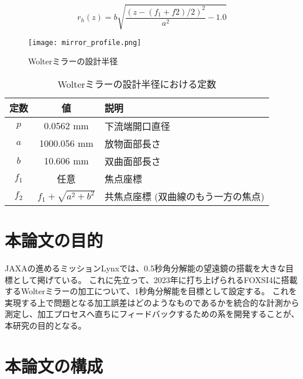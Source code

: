 \begin{equation}
    r_h(z) = b \sqrt{ \frac{(z - (f_1 + f2) / 2)^2}{a^2} - 1.0 }
\end{equation}

\begin{figure}[h]
\centering
\texttt{[image: mirror\_profile.png]}
\caption{Wolterミラーの設計半径}
\label{fig:wolter_profile}
\end{figure}

\begin{table}[htb]
    \begin{center}
      \begin{tabular}{|c|c|l|} \hline
        定数 & 値 & 説明 \\ \hline
        $p$ & 0.0562 mm & 下流端開口直径 \\
        $a$ & 1000.056 mm & 放物面部長さ \\
        $b$ & 10.606 mm & 双曲面部長さ \\ 
        $f_1$ & 任意 & 焦点座標 \\
        $f_2$ & $f_1 + \sqrt{ a^2 + b^2 }$  & 共焦点座標 (双曲線のもう一方の焦点) \\\hline
      \end{tabular}
      \caption{Wolterミラーの設計半径における定数}
      \label{tb:wolter_profile_constants}
    \end{center}
\end{table}


\clearpage
\newpage
\section{本論文の目的}
\label{chap1_purpose}

JAXAの進めるミッションLynxでは、0.5秒角分解能の望遠鏡の搭載を大きな目標として掲げている。\cite{Gaskin2019}
これに先立って、2023年に打ち上げられるFOXSI4に搭載するWolterミラーの加工について、1秒角分解能を目標として設定する。
これを実現する上で問題となる加工誤差はどのようなものであるかを統合的な計測から測定し、加工プロセスへ直ちにフィードバックするための系を開発することが、本研究の目的となる。

\section{本論文の構成}
\label{chap1_outline}

